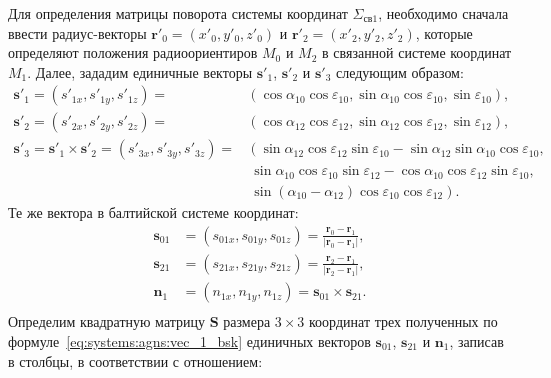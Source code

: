 \documentclass[../main.tex]{subfiles}
\begin{document}
Для определения матрицы поворота системы координат $\Sigma_{\text{св}1}$, необходимо сначала ввести радиус-векторы $\mathbf{r}'_0 = \left(x'_0, y'_0, z'_0\right)$ и $\mathbf{r}'_2 = \left(x'_2, y'_2, z'_2\right)$, которые определяют положения радиоориентиров $M_0$ и $M_2$ в связанной системе координат $M_1$. Далее, зададим единичные векторы $\mathbf{s}'_1$, $\mathbf{s}'_2$ и $\mathbf{s}'_3$ следующим образом:
\begin{equation}\label{eq:systems:agns:vec_1_local}
    \begin{split}
    \mathbf{s}'_1 = \left(s'_{1x}, s'_{1y}, s'_{1z}\right) = &\left(\cos\alpha_{10} \cos\varepsilon_{10}, \sin\alpha_{10}\cos\varepsilon_{10}, \sin\varepsilon_{10}\right),\\
    \mathbf{s}'_2 = \left(s'_{2x}, s'_{2y}, s'_{2z}\right) = &\left(\cos\alpha_{12} \cos\varepsilon_{12}, \sin\alpha_{12}\cos\varepsilon_{12}, \sin\varepsilon_{12}\right),\\
    \mathbf{s}'_3 = \mathbf{s}'_1 \times \mathbf{s}'_2 = \left(s'_{3x}, s'_{3y}, s'_{3z}\right) = &\left(\sin\alpha_{12}\cos\varepsilon_{12}\sin\varepsilon_{10} - \sin\alpha_{12}\sin\alpha_{10}\cos\varepsilon_{10},\right.\\
    &\ \sin\alpha_{10}\cos\varepsilon_{10}\sin\varepsilon_{12} - \cos\alpha_{10}\cos\varepsilon_{12}\sin\varepsilon_{10},\\
    &\ \left.\sin\left(\alpha_{10} - \alpha_{12}\right)\cos\varepsilon_{10}\cos\varepsilon_{12}\right).
    \end{split}
\end{equation}
Те же вектора в балтийской системе координат:
\begin{equation}\label{eq:systems:agns:vec_1_bsk}
    \begin{split}
        \mathbf{s}_{01} &= \left(s_{01x}, s_{01y}, s_{01z}\right) = \frac{\mathbf{r}_0 - \mathbf{r}_1}{|\mathbf{r}_0 - \mathbf{r}_1|},\\
        \mathbf{s}_{21} &= \left(s_{21x}, s_{21y}, s_{21z}\right) = \frac{\mathbf{r}_2 - \mathbf{r}_1}{|\mathbf{r}_2 - \mathbf{r}_1|},\\
        \mathbf{n}_1 &= \left(n_{1x}, n_{1y}, n_{1z}\right) = \mathbf{s}_{01} \times \mathbf{s}_{21}.\\
    \end{split}
\end{equation}
Определим квадратную матрицу $\mathbf{S}$ размера $3 \times 3$ координат трех полученных по формуле~\eqref{eq:systems:agns:vec_1_bsk} единичных векторов $\mathbf{s}_{01}$, $\mathbf{s}_{21}$ и $\mathbf{n}_{1}$, записав в столбцы, в соответствии с отношением:
\end{document}
